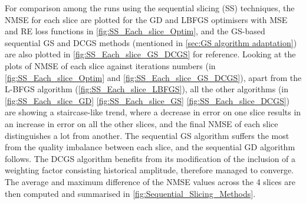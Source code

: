 For comparison among the runs using the sequential slicing (SS) techniques, the NMSE for each slice are plotted for the GD and LBFGS optimisers with MSE and RE loss functions in \cref{fig:SS_Each_slice_Optim}, and the GS-based sequential GS and DCGS \cite{Zhou2019} methods (mentioned in \cref{sec:GS algorithm adaptation}) are also plotted in \cref{fig:SS_Each_slice_GS_DCGS} for reference. Looking at the plots of NMSE of each slice against iterations numbers (in \cref{fig:SS_Each_slice_Optim} and \cref{fig:SS_Each_slice_GS_DCGS}), apart from the L-BFGS algorithm (\cref{fig:SS_Each_slice_LBFGS}), all the other algorithms (in \cref{fig:SS_Each_slice_GD} \cref{fig:SS_Each_slice_GS} \cref{fig:SS_Each_slice_DCGS}) are showing a staircase-like trend, where a decrease in error on one slice results in an increase in error on all the other slices, and the final NMSE of each slice distinguishes a lot from another. The sequential GS algorithm suffers the most from the quality imbalance between each slice, and the sequential GD algorithm follows. The DCGS algorithm benefits from its modification of the inclusion of a weighting factor consisting historical amplitude, therefore managed to converge. The average and maximum difference of the NMSE values across the 4 slices are then computed and summarised in \cref{fig:Sequential_Slicing_Methods}.

